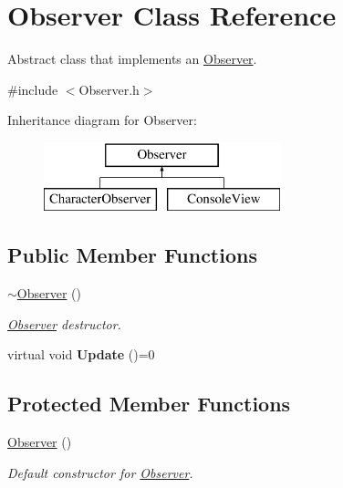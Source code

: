 \hypertarget{class_observer}{}\section{Observer Class Reference}
\label{class_observer}


Abstract class that implements an \hyperlink{class_observer}{Observer}.  




{\ttfamily \#include $<$Observer.\+h$>$}

Inheritance diagram for Observer\+:\begin{figure}[H]
\begin{center}
\leavevmode
\includegraphics[height=2.000000cm]{class_observer}
\end{center}
\end{figure}
\subsection*{Public Member Functions}
\begin{DoxyCompactItemize}
\item 
\hypertarget{class_observer_a450645e61c136826f09940a1334c7f34}{}\label{class_observer_a450645e61c136826f09940a1334c7f34} 
\hyperlink{class_observer_a450645e61c136826f09940a1334c7f34}{$\sim$\+Observer} ()
\begin{DoxyCompactList}\small\item\em \hyperlink{class_observer}{Observer} destructor. \end{DoxyCompactList}\item 
\hypertarget{class_observer_a3c7c1dd5ca0f7bdb0e05098d1b7aac41}{}\label{class_observer_a3c7c1dd5ca0f7bdb0e05098d1b7aac41} 
virtual void {\bfseries Update} ()=0
\end{DoxyCompactItemize}
\subsection*{Protected Member Functions}
\begin{DoxyCompactItemize}
\item 
\hypertarget{class_observer_a19c43f80a38a332a6f694783df3c9835}{}\label{class_observer_a19c43f80a38a332a6f694783df3c9835} 
\hyperlink{class_observer_a19c43f80a38a332a6f694783df3c9835}{Observer} ()
\begin{DoxyCompactList}\small\item\em Default constructor for \hyperlink{class_observer}{Observer}. \end{DoxyCompactList}\end{DoxyCompactItemize}


